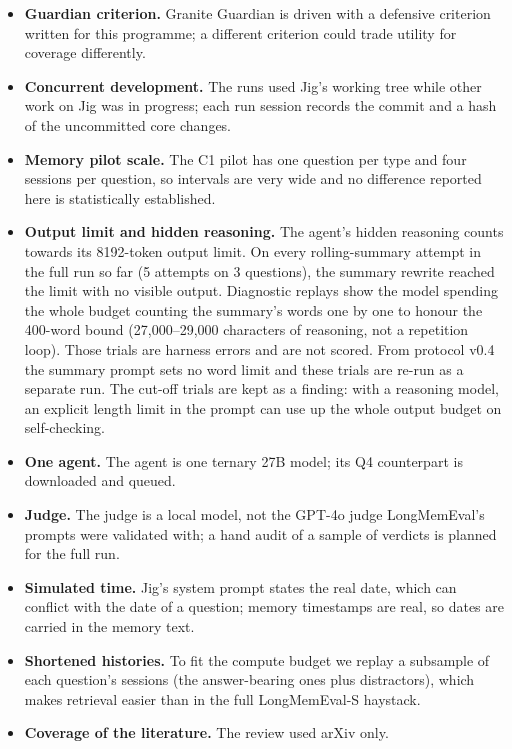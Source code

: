 \begin{itemize}
  after a harness change during the run: none of the Granite Guardian trials and 87 of 140 no-reviewer
  trials (in which every refusal is necessarily a core rule).
\item \textbf{Guardian criterion.} Granite Guardian is driven with a defensive criterion written for this
  programme; a different criterion could trade utility for coverage differently.
\item \textbf{Concurrent development.} The runs used Jig's working tree while other work on Jig was in
  progress; each run session records the commit and a hash of the uncommitted core changes.
\item \textbf{Memory pilot scale.} The C1 pilot has one question per type and four sessions per question,
  so intervals are very wide and no difference reported here is statistically established.
\item \textbf{Output limit and hidden reasoning.} The agent's hidden reasoning counts towards its
  8192-token output limit. On every rolling-summary attempt in the full run so far (5 attempts on 3
  questions), the summary rewrite reached the limit with no visible output. Diagnostic replays show the
  model spending the whole budget counting the summary's words one by one to honour the 400-word bound
  (27{,}000--29{,}000 characters of reasoning, not a repetition loop). Those trials are harness errors and are not scored. From protocol
  v0.4 the summary prompt sets no word limit and these trials are re-run as a separate run. The cut-off
  trials are kept as a finding: with a reasoning model, an explicit length limit in the prompt can use up
  the whole output budget on self-checking.
\item \textbf{One agent.} The agent is one ternary 27B model; its Q4 counterpart is downloaded and queued.
\item \textbf{Judge.} The judge is a local model, not the GPT-4o judge LongMemEval's prompts were
  validated with; a hand audit of a sample of verdicts is planned for the full run.
\item \textbf{Simulated time.} Jig's system prompt states the real date, which can conflict with the
  date of a question; memory timestamps are real, so dates are carried in the memory text.
\item \textbf{Shortened histories.} To fit the compute budget we replay a subsample of each question's
  sessions (the answer-bearing ones plus distractors), which makes retrieval easier than in the full
  LongMemEval-S haystack.
\item \textbf{Coverage of the literature.} The review used arXiv only.
\end{itemize}
